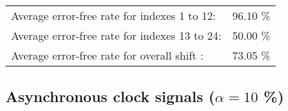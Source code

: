 \begin{table}[h]
\begin{center}
\begin{tabular}{|c|c|c|c|c|}
\end{tabular}


\flushleft
\begin{tabular}{l l}
Average error-free rate for indexes  1 to 12: & 96.10 \% \\
Average error-free rate for indexes 13 to 24: & 50.00 \% \\
Average error-free rate for overall shift   : & 73.05 \% \\

\end{tabular}


\end{center}
\end{table}




\pagebreak
\subsection{Asynchronous clock signals ($\alpha=10$ \%)}

